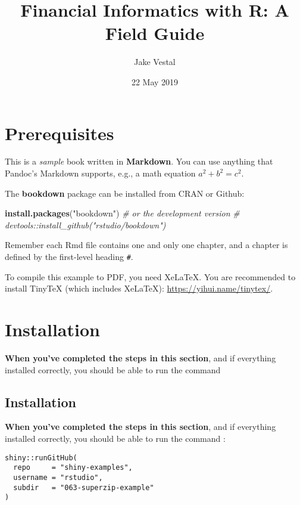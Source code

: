 \documentclass[]{book}
\title{Financial Informatics with R: A Field Guide}
\author{Jake Vestal}
\date{22 May 2019}
\newenvironment{Shaded}{\begin{snugshade}}{\end{snugshade}}
\newcommand{\KeywordTok}[1]{\textcolor[rgb]{0.13,0.29,0.53}{\textbf{#1}}}
\newcommand{\StringTok}[1]{\textcolor[rgb]{0.31,0.60,0.02}{#1}}
\newcommand{\CommentTok}[1]{\textcolor[rgb]{0.56,0.35,0.01}{\textit{#1}}}
\newcommand{\NormalTok}[1]{#1}
\begin{document}
\maketitle

{
\setcounter{tocdepth}{1}
\tableofcontents
}
\chapter{Prerequisites}\label{prerequisites}

This is a \emph{sample} book written in \textbf{Markdown}. You can use
anything that Pandoc's Markdown supports, e.g., a math equation
\(a^2 + b^2 = c^2\).

The \textbf{bookdown} package can be installed from CRAN or Github:

\begin{Shaded}
\begin{Highlighting}[]
\KeywordTok{install.packages}\NormalTok{(}\StringTok{"bookdown"}\NormalTok{)}
\CommentTok{# or the development version}
\CommentTok{# devtools::install_github("rstudio/bookdown")}
\end{Highlighting}
\end{Shaded}

Remember each Rmd file contains one and only one chapter, and a chapter
is defined by the first-level heading \texttt{\#}.

To compile this example to PDF, you need XeLaTeX. You are recommended to
install TinyTeX (which includes XeLaTeX):
\url{https://yihui.name/tinytex/}.

\chapter{Installation}\label{installation}

\textbf{When you've completed the steps in this section}, and if
everything installed correctly, you should be able to run the command

\section{Installation}\label{installation-1}

\textbf{When you've completed the steps in this section}, and if
everything installed correctly, you should be able to run the command :

\begin{verbatim}
shiny::runGitHub(
  repo     = "shiny-examples",
  username = "rstudio",
  subdir   = "063-superzip-example"
)
\end{verbatim}
\end{document}
